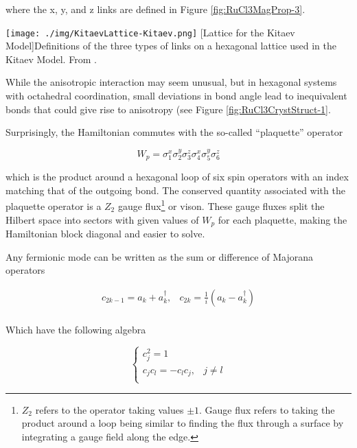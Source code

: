 where the x, y, and z links are defined in Figure \ref{fig:RuCl3MagProp-3}.

\begin{centering}
\texttt{[image: ./img/KitaevLattice-Kitaev.png]}
  \captionsetup{width=0.75\textwidth}
  [Lattice for the Kitaev Model]{Definitions of the three types of links on a hexagonal lattice used in the Kitaev Model. From \cite{Kitaev2006}.} 
  \label{fig:RuCl3MagProp-3}
\end{centering}

While the anisotropic interaction may seem unusual, but in hexagonal systems with octahedral coordination, small deviations in bond angle lead to inequivalent bonds that could give rise to anisotropy (see Figure \ref{fig:RuCl3CrystStruct-1}.

Surprisingly, the Hamiltonian commutes with the so-called ``plaquette'' operator

\begin{equation}
W_{p} = \sigma_{1}^{x}\sigma_{2}^{y}\sigma_{3}^{z}\sigma_{4}^{x}\sigma_{5}^{y}\sigma_{6}^{z}
\end{equation}

which is the product around a hexagonal loop of six spin operators with an index matching that of the outgoing bond. The conserved quantity associated with the plaquette operator is a $Z_{2}$ gauge flux\footnote{$Z_{2}$ refers to the operator taking values $\pm 1$. Gauge flux refers to taking the product around a loop being similar to finding the flux through a surface by integrating a gauge field along the edge.} or vison. These gauge fluxes split the Hilbert space into sectors with given values of $W_{p}$ for each plaquette, making the Hamiltonian block diagonal and easier to solve.

Any fermionic mode can be written as the sum or difference of Majorana operators

\begin{equation}
\begin{array}{cc}
	c_{2k-1} = a_{k} + a_{k}^{\dagger}, & c_{2k} = \frac{1}{i} (a_{k} - a_{k}^{\dagger}) \\
\end{array}
\end{equation}

Which have the following algebra

\begin{equation}
\begin{cases}
	c_{j}^{2} = 1 \\
	c_{j} c_{l} = - c_{l} c_{j}, & j \neq l \\
\end{cases}
\end{equation}

